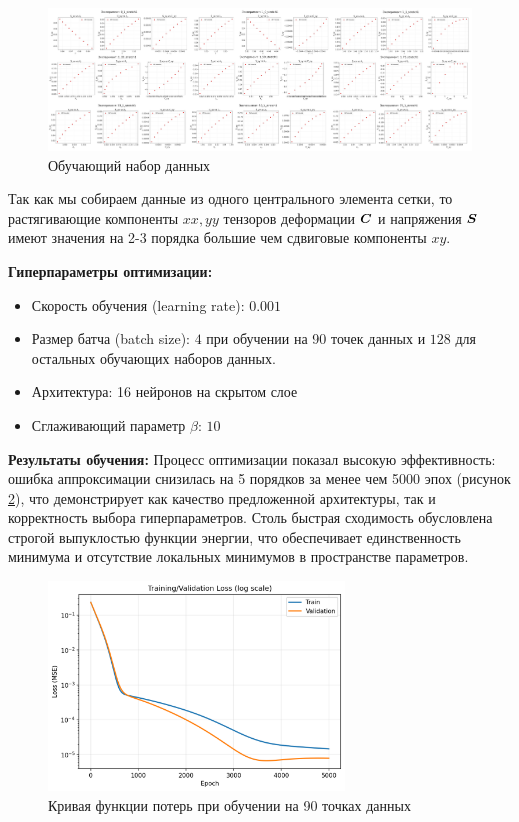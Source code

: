 \begin{figure}[H]
  \centering
  \includegraphics[width=1.0\textwidth]{img/all_stress_plots.png}
  \caption{Обучающий набор данных}
  \label{fig:training_data}
\end{figure}

Так как мы собираем данные из одного центрального элемента сетки, то растягивающие компоненты $xx, yy$ тензоров деформации $\boldsymbol{C}$ и напряжения
$\boldsymbol{S}$ имеют значения на 2-3 порядка большие чем сдвиговые компоненты $xy$.

\textbf{Гиперпараметры оптимизации:}
\begin{itemize}
  \item Скорость обучения (learning rate): $0.001$
  \item Размер батча (batch size): $4$ при обучении на 90 точек данных и $128$ для остальных обучающих наборов данных.
  \item Архитектура: 16 нейронов на скрытом слое
  \item Сглаживающий параметр $\beta$: $10$
\end{itemize}

\textbf{Результаты обучения:}
Процесс оптимизации показал высокую эффективность: ошибка аппроксимации снизилась на 5 порядков за менее чем 5000 эпох (рисунок \ref{fig:loss_curve}), 
что демонстрирует как качество предложенной архитектуры, так и корректность выбора гиперпараметров. 
Столь быстрая сходимость обусловлена строгой выпуклостью функции энергии, что обеспечивает единственность 
минимума и отсутствие локальных минимумов в пространстве параметров.

\begin{figure}[H]
  \centering
  \includegraphics[width=0.7\textwidth]{img/loss_curve.png}
  \caption{Кривая функции потерь при обучении на 90 точках данных}
  \label{fig:loss_curve}
\end{figure}


